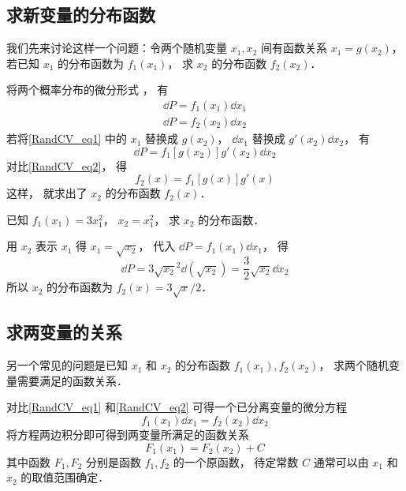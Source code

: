 

\subsection{求新变量的分布函数}

我们先来讨论这样一个问题：令两个随机变量 $x_1, x_2$ 间有函数关系 $x_1 = g(x_2)$， 若已知 $x_1$ 的分布函数为 $f_1(x_1)$， 求 $x_2$ 的分布函数 $f_2(x_2)$．

将两个概率分布的微分形式%
， 有
\begin{gather}
\dd{P} = f_1(x_1) \dd{x_1}\label{RandCV_eq1}\\
\dd{P} = f_2(x_2) \dd{x_2} \label{RandCV_eq2}
\end{gather}
若将\autoref{RandCV_eq1} 中的 $x_1$ 替换成 $g(x_2)$， $\dd{x_1}$ 替换成 $g'(x_2)\dd{x_2}$， 有
\begin{equation}
\dd{P} = f_1[g(x_2)] g'(x_2) \dd{x_2}
\end{equation}
对比\autoref{RandCV_eq2}， 得
\begin{equation}
f_2(x) = f_1[g(x)] g'(x)
\end{equation}
这样， 就求出了 $x_2$ 的分布函数 $f_2(x)$．

\begin{exam}{}
已知 $f_1(x_1) = 3x_1^2$， $x_2 = x_1^2$， 求 $x_2$ 的分布函数．

用 $x_2$ 表示 $x_1$ 得 $x_1 = \sqrt{x_2}$， 代入 $\dd{P} = f_1(x_1)\dd{x_1}$， 得
\begin{equation}
\dd{P} = 3\sqrt{x_2}^2 \dd(\sqrt{x_2}) = \frac32 \sqrt{x_2} \dd{x_2}
\end{equation}
所以 $x_2$ 的分布函数为 $f_2(x) = 3\sqrt{x}/2$．
\end{exam}

\subsection{求两变量的关系}

另一个常见的问题是已知 $x_1$ 和 $x_2$ 的分布函数 $f_1(x_1), f_2(x_2)$， 求两个随机变量需要满足的函数关系．

对比\autoref{RandCV_eq1} 和\autoref{RandCV_eq2} 可得一个已分离变量的微分方程
\begin{equation}\label{RandCV_eq6}
f_1(x_1)\dd{x_1} = f_2(x_2)\dd{x_2}
\end{equation}
将方程两边积分即可得到两变量所满足的函数关系
\begin{equation}
F_1(x_1) = F_2(x_2) + C
\end{equation}
其中函数 $F_1, F_2$ 分别是函数 $f_1, f_2$ 的一个原函数， 待定常数 $C$ 通常可以由 $x_1$ 和 $x_2$ 的取值范围确定．

